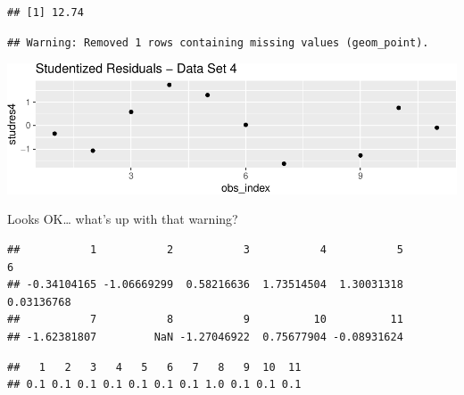 \documentclass[]{extarticle}
\newenvironment{Shaded}{\begin{snugshade}}{\end{snugshade}}
\newcommand{\DecValTok}[1]{\textcolor[rgb]{0.00,0.00,0.81}{#1}}
\newcommand{\CommentTok}[1]{\textcolor[rgb]{0.56,0.35,0.01}{\textit{#1}}}
\newcommand{\OperatorTok}[1]{\textcolor[rgb]{0.81,0.36,0.00}{\textbf{#1}}}
\newcommand{\NormalTok}[1]{#1}
\begin{document}
\begin{Shaded}
\end{Shaded}

\begin{verbatim}
## [1] 12.74
\end{verbatim}

\begin{verbatim}
## Warning: Removed 1 rows containing missing values (geom_point).
\end{verbatim}

\includegraphics{20190417_residual_diagnostics_files/figure-latex/unnamed-chunk-8-1.pdf}

Looks OK\ldots{} what's up with that warning?

\begin{Shaded}
\end{Shaded}

\begin{verbatim}
##           1           2           3           4           5           6 
## -0.34104165 -1.06669299  0.58216636  1.73514504  1.30031318  0.03136768 
##           7           8           9          10          11 
## -1.62381807         NaN -1.27046922  0.75677904 -0.08931624
\end{verbatim}

\begin{Shaded}
\end{Shaded}

\begin{verbatim}
##   1   2   3   4   5   6   7   8   9  10  11 
## 0.1 0.1 0.1 0.1 0.1 0.1 0.1 1.0 0.1 0.1 0.1
\end{verbatim}
\end{document}
